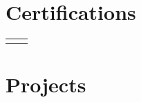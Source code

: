 \documentclass[11pt, letterpaper]{resume}
\begin{document}
\begin{paracol}{2}

\section*{Certifications}
\begin{supertabular}{rl}


\end{supertabular}

\bigskip


\section*{Projects}








\end{paracol}
\end{document}
